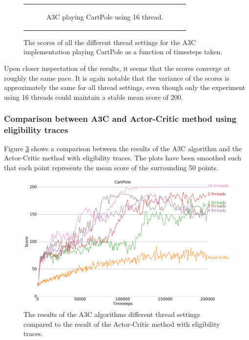 \documentclass[11pt]{article}
\begin{document}
\begin{figure}[H]
\begin{tabular}[c]{c}
\begin{subfigure}[c]{.5\textwidth}
        \caption{A3C playing CartPole using 16 thread.}
        \label{cp:16}
    \end{subfigure}
  \end{tabular}
  \caption{The scores of all the different thread settings for the
    A3C implementation playing CartPole as a function of timesteps taken.}
     \label{fig:a3c_comp_steps}
\end{figure}

Upon closer inspectation of the results, it seems that the scores
converge at roughly the same pace.
It is again notable that the variance of the scores is approximately
the same for all thread settings, even though only the experiment using 16 threads
could maintain a stable mean score of 200.

\subsubsection{Comparison between A3C and Actor-Critic method using eligibility traces}

Figure \ref{fig:a3c_comp_eligibility} shows a comparison between the
results of the A3C algorithm and the Actor-Critic method with eligibility
traces.
The plots have been smoothed such that each point represents the mean score of the surrounding 50
points.

\begin{figure}[H]
    \centering
    \includegraphics[scale=0.4]{plots/cartpole_compare_counter_with_AC.png}
    \caption{The results of the A3C algorithms different thread
            settings compared to the result of the Actor-Critic method
            with eligibility traces.}
    \label{fig:a3c_comp_eligibility}
\end{figure}
\end{document}
